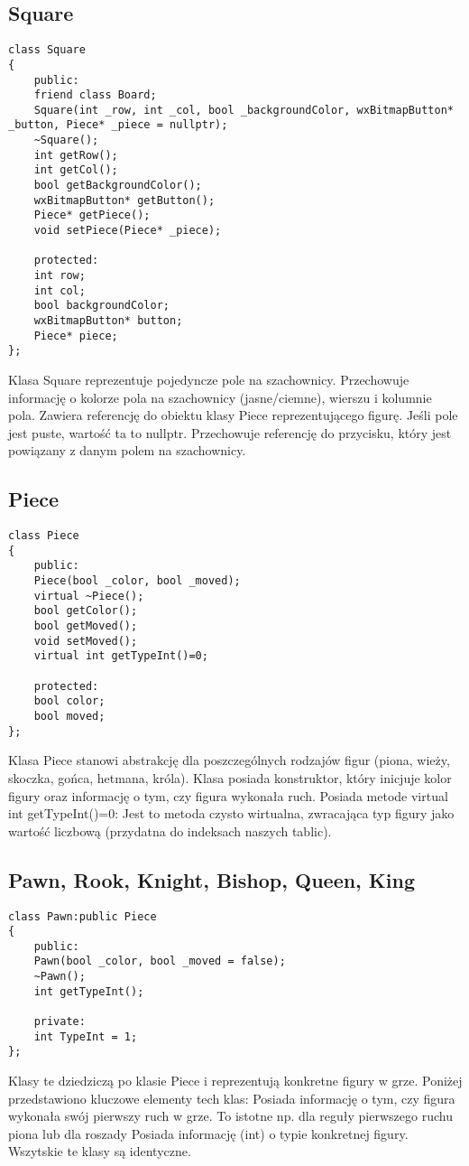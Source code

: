 \documentclass[]{report}
\begin{document}
\subsection*{Square}

\begin{lstlisting}
class Square
{
	public:
	friend class Board;
	Square(int _row, int _col, bool _backgroundColor, wxBitmapButton* _button, Piece* _piece = nullptr);
	~Square();
	int getRow();
	int getCol();
	bool getBackgroundColor();
	wxBitmapButton* getButton();
	Piece* getPiece();
	void setPiece(Piece* _piece);
	
	protected:
	int row;
	int col;
	bool backgroundColor;
	wxBitmapButton* button;
	Piece* piece;
};
\end{lstlisting}
\begin{flushleft}
Klasa Square reprezentuje pojedyncze pole na szachownicy. Przechowuje informację o kolorze pola na szachownicy (jasne/ciemne), wierszu i kolumnie pola. Zawiera referencję do obiektu klasy Piece reprezentującego figurę. Jeśli pole jest puste, wartość ta to nullptr. Przechowuje referencję do przycisku, który jest powiązany z danym polem na szachownicy.
\end{flushleft}
\subsection*{Piece}

\begin{lstlisting}
class Piece
{
	public:
	Piece(bool _color, bool _moved);
	virtual ~Piece();
	bool getColor();
	bool getMoved();
	void setMoved();
	virtual int getTypeInt()=0;
	
	protected:
	bool color;
	bool moved;
};
\end{lstlisting}
\vspace{\baselineskip}
Klasa Piece stanowi abstrakcję dla poszczególnych rodzajów figur (piona, wieży, skoczka, gońca, hetmana, króla). Klasa posiada konstruktor, który inicjuje kolor figury oraz informację o tym, czy figura wykonała ruch. Posiada metode virtual int getTypeInt()=0: Jest to metoda czysto wirtualna, zwracająca typ figury jako wartość liczbową (przydatna do indeksach naszych tablic).

\subsection*{Pawn, Rook, Knight, Bishop, Queen, King}

\begin{lstlisting}
class Pawn:public Piece
{
	public:
	Pawn(bool _color, bool _moved = false);
	~Pawn();
	int getTypeInt();
	
	private:
	int TypeInt = 1;
};
\end{lstlisting}
\vspace{\baselineskip}
Klasy te dziedziczą po klasie Piece i reprezentują konkretne figury w grze. Poniżej przedstawiono kluczowe elementy tech klas: Posiada informację o tym, czy figura wykonała swój pierwszy ruch w grze. To istotne np. dla reguły pierwszego ruchu piona lub dla roszady Posiada informację (int) o typie konkretnej figury. Wszytskie te klasy są identyczne.
\end{document}
